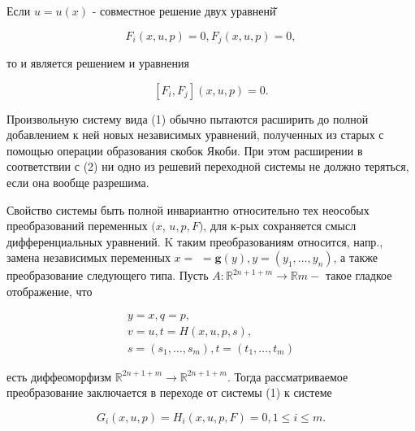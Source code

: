 \documentclass[10pt]{article}
\begin{document}
Если $u=u(x)$ - совместное решение двух уравненй̆



\[

F_{i}(x, u, p)=0, F_{j}(x, u, p)=0,

\]



то $и$ является решением и уравнения



\[

\left[F_{i}, F_{j}\right](x, u, p)=0 .

\]



Произвольную систему вида (1) обычно пытаются расширить до полной добавлением к ней новых независимых уравнений, полученных из старых с помощью операции образования скобок Якоби. При этом расширении в соответствии с (2) ни одно из решевий переходной системы не должно теряться, если она вообще разрешима.



Свойство системы быть полной инвариантно относительно тех неособых преобразований переменных $(x$, $u, p, F)$, для к-рых сохраняется смысл дифференциальных уравнений. $\mathrm{K}$ таким преобразованиям относится, напр., замена независимых переменных $x=$ $=\boldsymbol{g}(y), y=\left(y_{1}, \ldots, y_{n}\right)$, а также преобразование следующего типа. Пусть $A: \mathbb{R}^{2 n+1+m} \rightarrow \mathbb{R} m-$ такое гладкое отображение, что



\[

\begin{gathered}

y=x, q=p, \\

v=u, t=H(x, u, p, s), \\

s=\left(s_{1}, \ldots, s_{m}\right), t=\left(t_{1}, \ldots, t_{m}\right)

\end{gathered}

\]



есть диффеоморфизм $\mathbb{R}^{2 n+1+m} \rightarrow \mathbb{R}^{2 n+1+m}$. Тогда рассматриваемое преобразование заключается в переходе от системы (1) к системе



\[

G_{i}(x, u, p)=H_{i}(x, u, p, F)=0,1 \leqslant i \leqslant m .

\]
\end{document}
